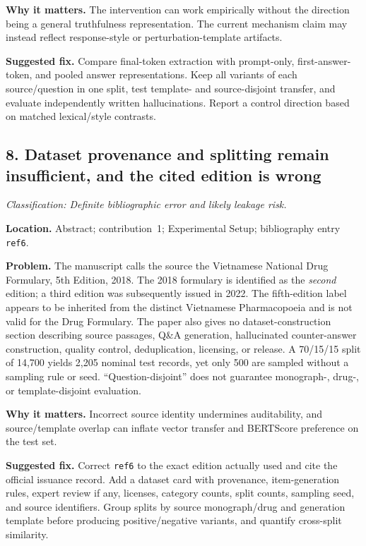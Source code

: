 \documentclass[11pt]{article}
\newcommand{\findinglabel}[1]{\textbf{#1}}
\newcommand{\classification}[1]{\textit{Classification: #1.}}
\begin{document}
\findinglabel{Why it matters.} The intervention can work empirically without the direction being a general truthfulness representation.  The current mechanism claim may instead reflect response-style or perturbation-template artifacts.

\findinglabel{Suggested fix.} Compare final-token extraction with prompt-only, first-answer-token, and pooled answer representations.  Keep all variants of each source/question in one split, test template- and source-disjoint transfer, and evaluate independently written hallucinations.  Report a control direction based on matched lexical/style contrasts.

\subsection*{8. Dataset provenance and splitting remain insufficient, and the cited edition is wrong}

\classification{Definite bibliographic error and likely leakage risk}

\findinglabel{Location.} Abstract; contribution~1; Experimental Setup; bibliography entry \texttt{ref6}.

\findinglabel{Problem.} The manuscript calls the source the Vietnamese National Drug Formulary, 5th Edition, 2018.  The 2018 formulary is identified as the \emph{second} edition; a third edition was subsequently issued in 2022.  The fifth-edition label appears to be inherited from the distinct Vietnamese Pharmacopoeia and is not valid for the Drug Formulary.  The paper also gives no dataset-construction section describing source passages, Q\&A generation, hallucinated counter-answer construction, quality control, deduplication, licensing, or release.  A 70/15/15 split of 14,700 yields 2,205 nominal test records, yet only 500 are sampled without a sampling rule or seed.  ``Question-disjoint'' does not guarantee monograph-, drug-, or template-disjoint evaluation.

\findinglabel{Why it matters.} Incorrect source identity undermines auditability, and source/template overlap can inflate vector transfer and BERTScore preference on the test set.

\findinglabel{Suggested fix.} Correct \texttt{ref6} to the exact edition actually used and cite the official issuance record.  Add a dataset card with provenance, item-generation rules, expert review if any, licenses, category counts, split counts, sampling seed, and source identifiers.  Group splits by source monograph/drug and generation template before producing positive/negative variants, and quantify cross-split similarity.
\end{document}
